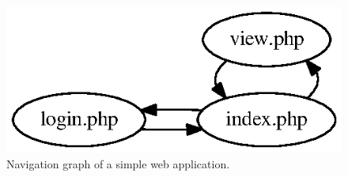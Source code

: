 \begin{figure}[tb]
  \centering
  \includegraphics{figures/simple_nav_graph.ps}
  \caption{Navigation graph of a simple web application.}
\end{figure}
